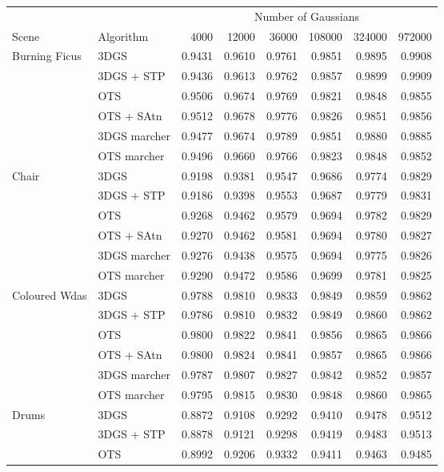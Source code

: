 \begin{longtable}[H]{llrrrrrr}
\toprule
& & \multicolumn{6}{c}{Number of Gaussians} \\
Scene & Algorithm & 4000 & 12000 & 36000 & 108000 & 324000 & 972000 \\
\midrule \endhead
Burning Ficus & 3DGS & 0.9431 & 0.9610 & 0.9761 & 0.9851 & 0.9895 & 0.9908 \\
 & 3DGS + STP & 0.9436 & 0.9613 & 0.9762 & 0.9857 & 0.9899 & 0.9909 \\
 & OTS & 0.9506 & 0.9674 & 0.9769 & 0.9821 & 0.9848 & 0.9855 \\
 & OTS + SAtn & 0.9512 & 0.9678 & 0.9776 & 0.9826 & 0.9851 & 0.9856 \\
 & 3DGS marcher & 0.9477 & 0.9674 & 0.9789 & 0.9851 & 0.9880 & 0.9885 \\
 & OTS marcher & 0.9496 & 0.9660 & 0.9766 & 0.9823 & 0.9848 & 0.9852 \\
Chair & 3DGS & 0.9198 & 0.9381 & 0.9547 & 0.9686 & 0.9774 & 0.9829 \\
 & 3DGS + STP & 0.9186 & 0.9398 & 0.9553 & 0.9687 & 0.9779 & 0.9831 \\
 & OTS & 0.9268 & 0.9462 & 0.9579 & 0.9694 & 0.9782 & 0.9829 \\
 & OTS + SAtn & 0.9270 & 0.9462 & 0.9581 & 0.9694 & 0.9780 & 0.9827 \\
 & 3DGS marcher & 0.9276 & 0.9438 & 0.9575 & 0.9694 & 0.9775 & 0.9826 \\
 & OTS marcher & 0.9290 & 0.9472 & 0.9586 & 0.9699 & 0.9781 & 0.9825 \\
Coloured Wdas & 3DGS & 0.9788 & 0.9810 & 0.9833 & 0.9849 & 0.9859 & 0.9862 \\
 & 3DGS + STP & 0.9786 & 0.9810 & 0.9832 & 0.9849 & 0.9860 & 0.9862 \\
 & OTS & 0.9800 & 0.9822 & 0.9841 & 0.9856 & 0.9865 & 0.9866 \\
 & OTS + SAtn & 0.9800 & 0.9824 & 0.9841 & 0.9857 & 0.9865 & 0.9866 \\
 & 3DGS marcher & 0.9787 & 0.9807 & 0.9827 & 0.9842 & 0.9852 & 0.9857 \\
 & OTS marcher & 0.9795 & 0.9815 & 0.9830 & 0.9848 & 0.9860 & 0.9865 \\
Drums & 3DGS & 0.8872 & 0.9108 & 0.9292 & 0.9410 & 0.9478 & 0.9512 \\
 & 3DGS + STP & 0.8878 & 0.9121 & 0.9298 & 0.9419 & 0.9483 & 0.9513 \\
 & OTS & 0.8992 & 0.9206 & 0.9332 & 0.9411 & 0.9463 & 0.9485 \\

\end{longtable}
